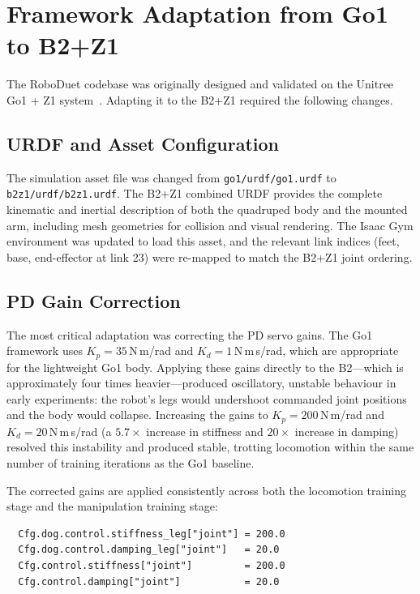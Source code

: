\section{Framework Adaptation from Go1 to B2+Z1}
\label{sec:framework_adaptation}

The RoboDuet codebase was originally designed and validated on the
Unitree Go1 + Z1 system~\cite{pan2024roboduet}.
Adapting it to the B2+Z1 required the following changes.

\subsection{URDF and Asset Configuration}

The simulation asset file was changed from
\texttt{go1/urdf/go1.urdf} to
\texttt{b2z1/urdf/b2z1.urdf}.
The B2+Z1 combined URDF provides the complete kinematic and inertial
description of both the quadruped body and the mounted arm,
including mesh geometries for collision and visual rendering.
The Isaac Gym environment was updated to load this asset, and the
relevant link indices (feet, base, end-effector at link 23) were
re-mapped to match the B2+Z1 joint ordering.

\subsection{PD Gain Correction}
\label{subsec:pdgain}

The most critical adaptation was correcting the PD servo gains.
The Go1 framework uses $K_p = 35$\,N\,m/rad and $K_d = 1$\,N\,m\,s/rad,
which are appropriate for the lightweight Go1 body.
Applying these gains directly to the B2---which is approximately four times
heavier---produced oscillatory, unstable behaviour in early experiments:
the robot's legs would undershoot commanded joint positions and the body
would collapse.
Increasing the gains to $K_p = 200$\,N\,m/rad and $K_d = 20$\,N\,m\,s/rad
(a $5.7\times$ increase in stiffness and $20\times$ increase in damping)
resolved this instability and produced stable, trotting locomotion within
the same number of training iterations as the Go1 baseline.

The corrected gains are applied consistently across both the locomotion
training stage and the manipulation training stage:
\begin{verbatim}
  Cfg.dog.control.stiffness_leg["joint"] = 200.0
  Cfg.dog.control.damping_leg["joint"]   = 20.0
  Cfg.control.stiffness["joint"]         = 200.0
  Cfg.control.damping["joint"]           = 20.0
\end{verbatim}


